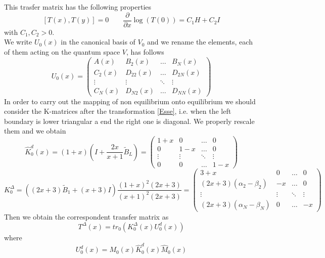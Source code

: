 \documentclass[11pt]{article}
\numberwithin{equation}{section}
\begin{document}
This trasfer matrix has the following properties
\begin{equation}
	\left[T(x),T(y)\right]=0\qquad \frac{\partial}{\partial x}\log (T(0))=C_{1}H+C_{2}I
\end{equation}
with $C_{1},C_{2}>0$. \\
We write $U_{0}(x)$ in the canonical basis of $V_{0}$ and we rename the elements, each of them acting on the quantum space $V$, has follows
\begin{equation}
	U_{0}(x)=\begin{pmatrix}
		A(x)&B_{2}(x)&\ldots&B_{N}(x)\\
		C_{2}(x)&D_{22}(x)&\ldots&D_{2N}(x)\\
		\vdots&\vdots&\ddots&\vdots\\
		C_{N}(x)&D_{N2}(x)&\ldots&D_{NN}(x)
	\end{pmatrix}
\end{equation}
In order to carry out the mapping of non equilibrium onto equilibrium we should consider the K-matrices after the transformation \eqref{Esse}, i.e. when the left boundary is lower triangular a end the right one is diagonal. We properly rescale them and we obtain
\begin{equation}
	\widehat{K}_{0}^{d}(x)=(1+x)\left(I+\frac{2x}{x+1}\widetilde{B}_{L}\right)=\begin{pmatrix}
		1+x&0&\ldots&0\\
		0&1-x&\ldots&0\\
		\vdots&\vdots&\ddots&\vdots\\
		0&0&\ldots&1-x
	\end{pmatrix}
\end{equation}
\begin{equation}
	K_{0}^{\Delta}=\left((2x+3)\widetilde{B}_{1}+(x+3)I\right)\frac{(1+x)^{2}(2x+3)}{(x+1)^{2}(2x+3)}=\begin{pmatrix}
		3+x&0&\ldots&0\\
		(2x+3)(\alpha_{2}-\beta_{2})&-x&\ldots&0\\
		\vdots&\vdots&\ddots&\vdots\\
		(2x+3)(\alpha_{N}-\beta_{N})&0&\ldots&-x
	\end{pmatrix}
\end{equation}
Then we obtain the correspondent transfer matrix as
\begin{equation}
	T^{\Delta}(x)=tr_{0}\left(K_{0}^{\Delta}(x)U_{0}^{d}(x)\right)
\end{equation}
where
\begin{equation}
	U_{0}^{d}(x)=M_{0}(x)\widehat{K}_{0}^{d}(x)\widehat{M}_{0}(x)
\end{equation}
\end{document}
